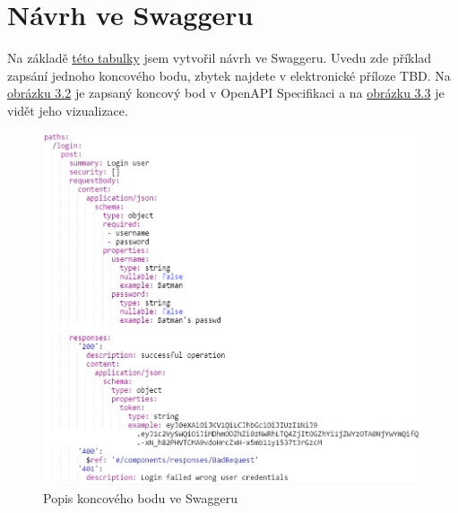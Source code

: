 \documentclass[thesis=B,czech]{FITthesis}[2012/06/26]
\begin{document}
    \section{Návrh ve Swaggeru}
        Na základě \hyperref[tab:tabulkaPokryti]{této tabulky} jsem vytvořil návrh ve Swaggeru. Uvedu zde příklad zapsání jednoho koncového bodu, zbytek najdete v elektronické příloze TBD. Na \hyperref[fig:SwaggerYAML]{obrázku 3.2} je zapsaný koncový bod v OpenAPI Specifikaci a na \hyperref[fig:SwaggerGenerated]{obrázku 3.3} je vidět jeho vizualizace.
        \begin{figure}[h!] \label{SwaggerYAML}
            \includegraphics[width=\linewidth]{Swagger_YAML_example}
            \caption{Popis koncového bodu ve Swaggeru}
        \end{figure}
\end{document}
